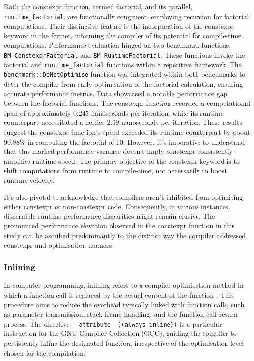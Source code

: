 \documentclass{article}
\theoremstyle{break}
\begin{document}
\noindent Both the constexpr function, termed factorial, and its parallel, \texttt{runtime\_factorial}, are functionally congruent, employing recursion for factorial computations. Their distinctive feature is the incorporation of the constexpr keyword in the former, informing the compiler of its potential for compile-time computations. Performance evaluation hinged on two benchmark functions, \texttt{BM\_ConstexprFactorial} and \texttt{BM\_Ru\-ntimeFactorial}. These functions invoke the factorial and \texttt{runtime\_factorial} functions within a repetitive framework. The \texttt{benchmark::DoNotOptimise} function was integrated within both benchmarks to deter the compiler from early optimisation of the factorial calculation, ensuring accurate performance metrics. Data showcased a notable performance gap between the factorial functions. The constexpr function recorded a computational span of approximately \(0.245\) nanoseconds per iteration, while its runtime counterpart necessitated a heftier \(2.69\) nanoseconds per iteration. These results suggest the constexpr function's speed exceeded its runtime counterpart by about \(90.88\%\) in computing the factorial of 10. However, it's imperative to understand that this marked performance variance doesn't imply constexpr consistently amplifies runtime speed. The primary objective of the constexpr keyword is to shift computations from runtime to compile-time, not necessarily to boost runtime velocity.

It's also pivotal to acknowledge that compilers aren't inhibited from optimising either constexpr or non-constexpr code. Consequently, in various instances, discernible runtime performance disparities might remain elusive. The pronounced performance elevation observed in the constexpr function in this study can be ascribed predominantly to the distinct way the compiler addressed constexpr and optimisation nuances.



\subsubsection*{Inlining}
In computer programming, inlining refers to a compiler optimisation method in which a function call is replaced by the actual content of the function \cite{14}. This procedure aims to reduce the overhead typically linked with function calls, such as parameter transmission, stack frame handling, and the function call-return process. The directive \texttt{\_\_attribute\_\_((always\_inline))} is a particular instruction for the GNU Compiler Collection (GCC), guiding the compiler to persistently inline the designated function, irrespective of the optimisation level chosen for the compilation.
\end{document}

